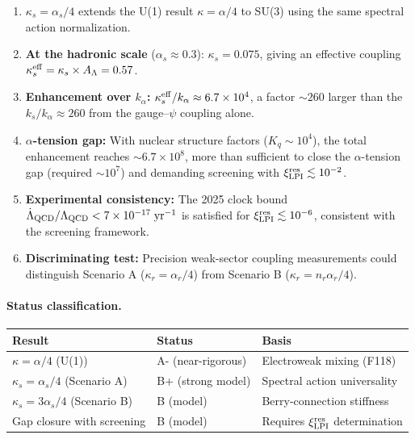 \documentclass[11pt,letterpaper]{article}
\newcommand{\kalpha}{k_\alpha}
\theoremstyle{definition}
\begin{document}
\begin{tcolorbox}[colback=green!5!white, colframe=green!50!black,
title=Key Results]
\begin{enumerate}
\item \textbf{$\kappa_s = \alpha_s/4$} extends the U(1) result
$\kappa = \alpha/4$ to SU(3) using the same spectral action
normalization.

\item \textbf{At the hadronic scale} ($\alpha_s \approx 0.3$):
$\kappa_s = 0.075$, giving an effective coupling
$\kappa_s^{\rm eff} = \kappa_s \times A_\Lambda = 0.57$.

\item \textbf{Enhancement over $\kalpha$:}
$\kappa_s^{\rm eff}/\kalpha \approx 6.7 \times 10^4$, a factor
$\sim 260$ larger than the $k_s/\kalpha \approx 260$ from the
gauge--$\psi$ coupling alone.

\item \textbf{$\alpha$-tension gap:} With nuclear structure factors
($K_q \sim 10^4$), the total enhancement reaches
$\sim 6.7 \times 10^8$, more than sufficient to close the
$\alpha$-tension gap (required $\sim 10^7$) and demanding
screening with $\xi_{\rm LPI}^{\rm res} \lesssim 10^{-2}$.

\item \textbf{Experimental consistency:} The 2025 clock bound
$\dot{\Lambda}_{\rm QCD}/\Lambda_{\rm QCD} < 7 \times 10^{-17}\;
\mathrm{yr}^{-1}$ is satisfied for
$\xi_{\rm LPI}^{\rm res} \lesssim 10^{-6}$, consistent with
the screening framework.

\item \textbf{Discriminating test:} Precision weak-sector coupling
measurements could distinguish Scenario A ($\kappa_r = \alpha_r/4$)
from Scenario B ($\kappa_r = n_r\alpha_r/4$).
\end{enumerate}
\end{tcolorbox}

\paragraph{Status classification.}
\begin{center}
\renewcommand{\arraystretch}{1.2}
\begin{tabular}{lll}
\toprule
Result & Status & Basis \\
\midrule
$\kappa = \alpha/4$ (U(1)) & A- (near-rigorous) & Electroweak mixing (F118) \\
$\kappa_s = \alpha_s/4$ (Scenario A) & B+ (strong model) & Spectral action universality \\
$\kappa_s = 3\alpha_s/4$ (Scenario B) & B (model) & Berry-connection stiffness \\
Gap closure with screening & B (model) & Requires $\xi_{\rm LPI}^{\rm res}$ determination \\
\bottomrule
\end{tabular}
\end{center}
\end{document}
